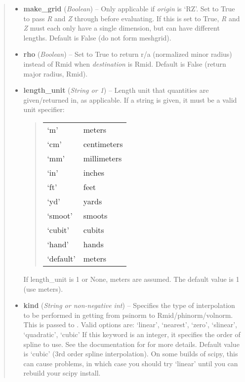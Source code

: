 \documentclass[letterpaper,10pt,english]{sphinxmanual}
\begin{document}
\begin{fulllineitems}
\begin{fulllineitems}
\begin{quote}
\begin{description}
\begin{itemize}
\item {} 
\textbf{make\_grid} (\emph{Boolean}) --
Only applicable if \emph{origin} is `RZ'. Set to
True to pass \emph{R} and \emph{Z} through 
before evaluating. If this is set to True, \emph{R} and \emph{Z} must each
only have a single dimension, but can have different lengths.
Default is False (do not form meshgrid).

\item {} 
\textbf{rho} (\emph{Boolean}) --
Set to True to return r/a (normalized minor radius)
instead of Rmid when \emph{destination} is Rmid. Default is False
(return major radius, Rmid).

\item {} 
\textbf{length\_unit} (\emph{String or 1}) --
Length unit that quantities are
given/returned in, as applicable. If a string is given, it must
be a valid unit specifier:
\begin{quote}

\begin{tabulary}{\linewidth}{|L|L|}
\hline

`m'
 & 
meters
\\

`cm'
 & 
centimeters
\\

`mm'
 & 
millimeters
\\

`in'
 & 
inches
\\

`ft'
 & 
feet
\\

`yd'
 & 
yards
\\

`smoot'
 & 
smoots
\\

`cubit'
 & 
cubits
\\

`hand'
 & 
hands
\\

`default'
 & 
meters
\\
\hline\end{tabulary}

\end{quote}

If length\_unit is 1 or None, meters are assumed. The default
value is 1 (use meters).

\item {} 
\textbf{kind} (\emph{String or non-negative int}) --
Specifies the type of
interpolation to be performed in getting from psinorm to
Rmid/phinorm/volnorm. This is passed to
. Valid options are:
`linear', `nearest', `zero', `slinear', `quadratic', `cubic'
If this keyword is an integer, it specifies the order of spline
to use. See the documentation for  for more
details. Default value is `cubic' (3rd order spline
interpolation). On some builds of scipy, this can cause problems,
in which case you should try `linear' until you can rebuild your
scipy install.


\end{itemize}
\end{description}
\end{quote}
\end{fulllineitems}
\end{fulllineitems}
\end{document}
